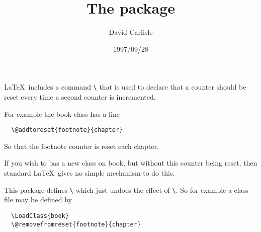 \documentclass[pagesize=auto, fontsize=14pt, parskip=half, DIV=10]{scrartcl}
\title{The \pkg{remreset} package}
\author{David Carlisle}
\date{1997/09/28}
\makeatletter
\newcommand*{\cs}[1]{\texttt{\textbackslash#1}}
\newcommand*{\cmd}[1]{\cs{\expandafter\@gobble\string#1}}
\makeatother
\begin{document}
\maketitle

\LaTeX\ includes a command \cmd{\@addtoreset} that is used to declare that
a counter should be reset every time a second counter is incremented.

For example the book class has a line
%
\begin{verbatim}
  \@addtoreset{footnote}{chapter}
\end{verbatim}
%
So that the footnote counter is reset each chapter.

If you wish to bas a new class on book, but without this counter
being reset, then standard \LaTeX\ gives no simple mechanism to do
this.

This package defines \cmd{\@removefromreset} which just undoes the effect
of \cmd{\@addtorest}. So for example a class file may be defined by
%
\begin{verbatim}
  \LoadClass{book}
  \@removefromreset{footnote}{chapter}
\end{verbatim}
\end{document}
